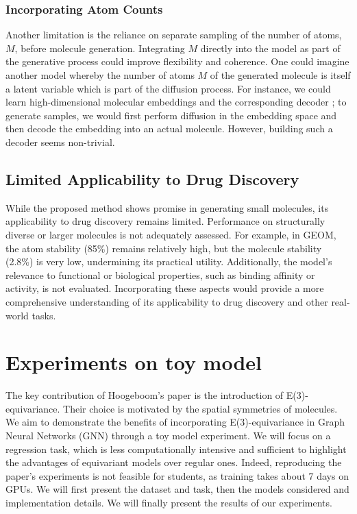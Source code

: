\documentclass[sigconf]{acmart}
\begin{document}
\subsubsection{Incorporating Atom Counts}
Another limitation is the reliance on separate sampling of the number of atoms, \(M\), before molecule generation. Integrating \(M\) directly into the model as part of the generative process could improve flexibility and coherence. One could imagine another model whereby the number of atoms $M$ of the generated molecule is itself a latent variable which is part of the diffusion process. For instance, we could learn high-dimensional molecular embeddings and the corresponding decoder ; to generate samples, we would first perform diffusion in the embedding space and then decode the embedding into an actual molecule. However, building such a decoder seems non-trivial.

\subsection{Limited Applicability to Drug Discovery}
While the proposed method shows promise in generating small molecules, its applicability to drug discovery remains limited. Performance on structurally diverse or larger molecules is not adequately assessed. For example, in GEOM, the atom stability (85\%) remains relatively high, but the molecule stability (2.8\%) is very low, undermining its practical utility. Additionally, the model’s relevance to functional or biological properties, such as binding affinity or activity, is not evaluated. Incorporating these aspects would provide a more comprehensive understanding of its applicability to drug discovery and other real-world tasks.


\section{Experiments on toy model}
The key contribution of Hoogeboom's paper is the introduction of E(3)-equivariance. Their choice is motivated by the spatial symmetries of molecules. We aim to demonstrate the benefits of incorporating E(3)-equivariance in Graph Neural Networks (GNN) through a toy model experiment. We will focus on a regression task, which is less computationally intensive and sufficient to highlight the advantages of equivariant models over regular ones. Indeed, reproducing the paper's experiments is not feasible for students, as training takes about 7 days on GPUs. We will first present the dataset and task, then the models considered and implementation details. We will finally present the results of our experiments.
\end{document}

